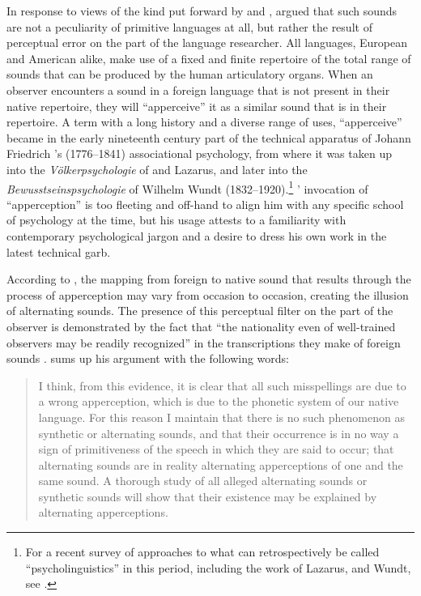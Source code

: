 \documentclass[output=paper]{langscibook}
\begin{document}
In response to views of the kind put forward by {\Brinton} and {\Powell}, {\Boas} argued that such sounds are not a peculiarity of primitive languages at all, but rather the result of perceptual error on the part of the language researcher. All languages, European and American alike, make use of a fixed and finite repertoire of the total range of sounds that can be produced by the human articulatory organs. When an observer encounters a sound in a foreign language that is not present in their native repertoire, they will ``apperceive'' it as a similar sound that is in their repertoire. A term with a long history and a diverse range of uses, ``apperceive'' became in the early nineteenth century part of the technical apparatus of Johann Friedrich {\Herbart}'s (1776--1841) associational psychology, from where it was taken up into the \emph{Völkerpsychologie} of {\Steinthal} and Lazarus, and later into the \emph{Bewusstseinspsychologie} of Wilhelm Wundt (1832--1920).\footnote{For a recent survey of approaches to what can retrospectively be called ``psycholinguistics'' in this period, including the work of Lazarus, {\Steinthal} and Wundt, see \citet{Levelt2013}.} {\Boas}' invocation of ``apperception'' is too fleeting and off-hand to align him with any specific school of psychology at the time, but his usage attests to a familiarity with contemporary psychological jargon and a desire to dress his own work in the latest technical garb.

According to {\Boas}, the mapping from foreign to native sound that results through the process of apperception may vary from occasion to occasion, creating the illusion of alternating sounds. The presence of this perceptual filter on the part of the observer is demonstrated by the fact that ``the nationality even of well-trained observers may be readily recognized'' in the transcriptions they make of foreign sounds \citep[51]{Boas1889}. {\Boas} sums up his argument with the following words:

\begin{quotation}
I think, from this evidence, it is clear that all such misspellings are due to a wrong apperception, which is due to the phonetic system of our native language. For this reason I maintain that there is no such phenomenon as synthetic or alternating sounds, and that their occurrence is in no way a sign of primitiveness of the speech in which they are said to occur; that alternating sounds are in reality alternating apperceptions of one and the same sound. A thorough study of all alleged alternating sounds or synthetic sounds will show that their existence may be explained by alternating apperceptions. \citep[52]{Boas1889}
\end{quotation}
\end{document}
